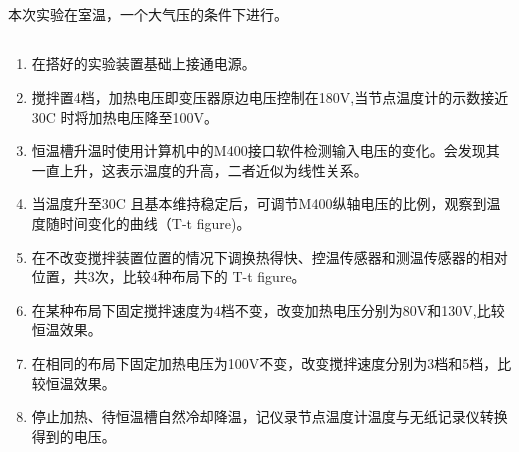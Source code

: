 ﻿\documentclass[10.5pt]{article}
\begin{document}
\subsection{\textbf{}}
本次实验在室温，一个大气压的条件下进行。
\subsection{\textbf{}}
\begin{enumerate}
\item 在搭好的实验装置基础上接通电源。
\item 搅拌置4档，加热电压即变压器原边电压控制在180V,当节点温度计的示数接近30\degree C 时将加热电压降至100V。
\item 恒温槽升温时使用计算机中的M400接口软件检测输入电压的变化。会发现其一直上升，这表示温度的升高，二者近似为线性关系。
\item 当温度升至30\degree C 且基本维持稳定后，可调节M400纵轴电压的比例，观察到温度随时间变化的曲线（T-t figure)。
\label{MYTtFigure}
\item 在不改变搅拌装置位置的情况下调换热得快、控温传感器和测温传感器的相对位置，共3次，比较4种布局下的 T-t figure。
\item 在某种布局下固定搅拌速度为4档不变，改变加热电压分别为80V和130V,比较恒温效果。
\item 在相同的布局下固定加热电压为100V不变，改变搅拌速度分别为3档和5档，比较恒温效果。
\item 停止加热、待恒温槽自然冷却降温，记仪录节点温度计温度与无纸记录仪转换得到的电压。
\end{enumerate}
\section{\textbf{}}
\end{document}
